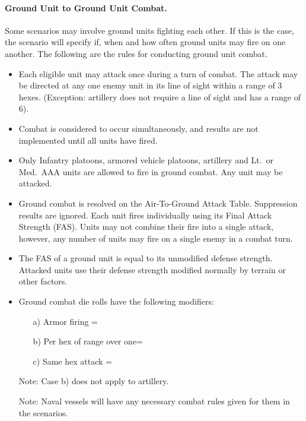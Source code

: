 \paragraph{Ground Unit to Ground Unit Combat.} Some scenarios may involve ground units fighting each other. If this is the case, the scenario will specify if, when and how often ground units may fire on one another. The following are the rules for conducting ground unit combat.
\begin{itemize}

    \item Each eligible unit may attack once during a turn of combat. The attack may be directed at any one enemy unit in its line of sight within a range of 3 hexes. (Exception: artillery does not require a line of sight and has a range of 6).

    \item Combat is considered to occur simultaneously, and results are not implemented until all units have fired.
    
    \item Only Infantry platoons, armored vehicle platoons, artillery and Lt.\ or Med.\ AAA units are allowed to fire in ground combat. Any unit may be attacked.

    \item Ground combat is resolved on the Air-To-Ground Attack Table. Suppression results are ignored. Each unit fires individually using its Final Attack Strength (FAS). Units may not combine their fire into a single attack, however, any number of units may fire on a single enemy in a combat turn.

    \item The FAS of a ground unit is equal to its unmodified defense strength. Attacked units use their defense strength modified normally by terrain or other factors.

    \item Ground combat die rolls have the following modifiers:
    \begin{enumerate}
        \item[a)] Armor firing = 
        \item[b)] Per hex of range over one= 
        \item[c)] Same hex attack = 
    \end{enumerate}

    Note: Case b) does not apply to artillery.

    Note: Naval vessels will have any necessary combat rules given for them in the scenarios. 

\end{itemize}

